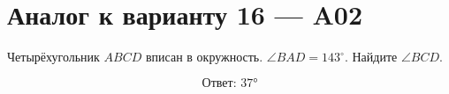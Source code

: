 


\section*{Аналог к варианту 16 — A02}
Четырёхугольник \(ABCD\) вписан в окружность. \(\angle BAD=143^\circ\). Найдите \(\angle BCD\).
\begin{center}\figCyclicOpposite\end{center}
\[\boxed{\text{Ответ: }37°}\]

